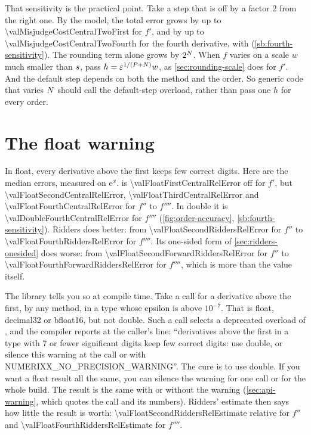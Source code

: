 That sensitivity is the practical point. Take a step that is off by a factor 2 from the right one. By the model, the
total error grows by up to \num{\valMisjudgeCostCentralTwoFirst} for $f'$, and by up to
\num{\valMisjudgeCostCentralTwoFourth} for the fourth derivative, with 
(\cref{sb:fourth-sensitivity}). The rounding term alone grows by $2^{N}$. When $f$ varies on a scale $w$ much
smaller than $s$, pass $h = \varepsilon^{1/(P + N)} w$, as \cref{sec:rounding-scale} does for $f'$. And
the default step depends on both the method and the order. So generic code that varies $N$ should call the
default-step overload, rather than pass one $h$ for every order.

\section{The float warning}\label{sec:orders-float}

In float, every derivative above the first keeps few correct digits. Here are the median errors, measured on
$\mathrm{e}^x$.  is \num{\valFloatFirstCentralRelError} off for $f'$, but
\num{\valFloatSecondCentralRelError}, \num{\valFloatThirdCentralRelError} and \num{\valFloatFourthCentralRelError}
for $f''$ to $f''''$. In double it is \num{\valDoubleFourthCentralRelError} for $f''''$ (\cref{fig:order-accuracy},
\cref{sb:fourth-sensitivity}). Ridders does better: from \num{\valFloatSecondRiddersRelError} for $f''$ to
\num{\valFloatFourthRiddersRelError} for $f''''$. Its one-sided form of \cref{sec:ridders-onesided} does worse: from
\num{\valFloatSecondForwardRiddersRelError} for $f''$ to \num{\valFloatFourthForwardRiddersRelError} for $f''''$,
which is more than the value itself.

The library tells you so at compile time. Take a call for a derivative above the first, by any method, in a type
whose epsilon is above $10^{-7}$. That is float, decimal32 or bfloat16, but not double. Such a call selects a
deprecated overload of , and the compiler reports at the caller's line: ``derivatives above the first in a type with 7 or
fewer significant digits keep few correct digits: use double, or silence this warning at the call or with
NUMERIXX\_NO\_PRECISION\_WARNING''. The cure is to use double. If you want a float result all the same, you can
silence the warning for one call or for the whole build. The result is the same with or without the warning
(\cref{sec:api-warning}, which quotes the call and its numbers). Ridders' estimate then says how little the result
is worth: \num{\valFloatSecondRiddersRelEstimate} relative for $f''$ and \num{\valFloatFourthRiddersRelEstimate} for
$f''''$.

